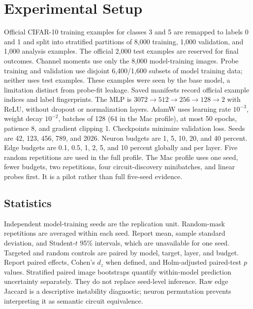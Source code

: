 \documentclass[11pt]{article}
\begin{document}
\section{Experimental Setup}
Official CIFAR-10 training examples for classes 3 and 5 are remapped to labels 0 and 1 and split into stratified partitions of 8,000 training, 1,000 validation, and 1,000 analysis examples. The official 2,000 test examples are reserved for final outcomes. Channel moments use only the 8,000 model-training images. Probe training and validation use disjoint 6,400/1,600 subsets of model training data; neither uses test examples. These examples were seen by the base model, a limitation distinct from probe-fit leakage. Saved manifests record official example indices and label fingerprints.
The MLP is $3072\to512\to256\to128\to2$ with ReLU, without dropout or normalization layers. AdamW uses learning rate $10^{-3}$, weight decay $10^{-2}$, batches of 128 (64 in the Mac profile), at most 50 epochs, patience 8, and gradient clipping 1. Checkpoints minimize validation loss. Seeds are 42, 123, 456, 789, and 2026. Neuron budgets are 1, 5, 10, 20, and 40 percent. Edge budgets are 0.1, 0.5, 1, 2, 5, and 10 percent globally and per layer. Five random repetitions are used in the full profile. The Mac profile uses one seed, fewer budgets, two repetitions, four circuit-discovery minibatches, and linear probes first. It is a pilot rather than full five-seed evidence.
\subsection{Statistics}
Independent model-training seeds are the replication unit. Random-mask repetitions are averaged within each seed. Report mean, sample standard deviation, and Student-$t$ 95\% intervals, which are unavailable for one seed. Targeted and random controls are paired by model, target, layer, and budget. Report paired effects, Cohen's $d_z$ when defined, and Holm-adjusted paired-test $p$ values. Stratified paired image bootstraps quantify within-model prediction uncertainty separately. They do not replace seed-level inference. Raw edge Jaccard is a descriptive instability diagnostic; neuron permutation prevents interpreting it as semantic circuit equivalence.
\end{document}
